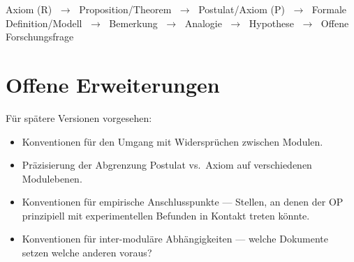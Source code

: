\documentclass[11pt,a4paper]{article}
\theoremstyle{plain}
\theoremstyle{definition}
\begin{document}
\begin{center}
\small
Axiom (R)
$\;\rightarrow\;$ Proposition/Theorem
$\;\rightarrow\;$ Postulat/Axiom (P)
$\;\rightarrow\;$ Formale Definition/Modell
$\;\rightarrow\;$ Bemerkung
$\;\rightarrow\;$ Analogie
$\;\rightarrow\;$ Hypothese
$\;\rightarrow\;$ Offene Forschungsfrage
\end{center}

\section{Offene Erweiterungen}

F\"{u}r sp\"{a}tere Versionen vorgesehen:
\begin{itemize}
  \item Konventionen f\"{u}r den Umgang mit Widerspr\"{u}chen zwischen Modulen.
  \item Pr\"{a}zisierung der Abgrenzung Postulat vs.\ Axiom auf verschiedenen
        Modulebenen.
  \item Konventionen f\"{u}r empirische Anschlusspunkte --- Stellen, an denen
        der OP prinzipiell mit experimentellen Befunden in Kontakt treten k\"{o}nnte.
  \item Konventionen f\"{u}r inter-modul\"{a}re Abh\"{a}ngigkeiten --- welche
        Dokumente setzen welche anderen voraus?
\end{itemize}
\end{document}
